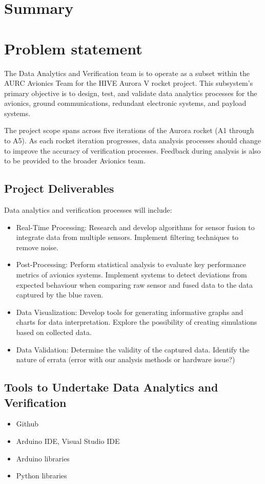 \section{Summary}
\section{Problem statement}
The Data Analytics and Verification team is to operate as a subset within the AURC Avionics Team for the HIVE Aurora V rocket project. This subsystem's primary objective is to design, test, and validate data analytics processes for the avionics, ground communications, redundant electronic systems, and payload systems.  

The project scope spans across five iterations of the Aurora rocket (A1 through to A5). As each rocket iteration progresses, data analysis processes should change to improve the accuracy of verification processes. Feedback during analysis is also to be provided to the broader Avionics team.     

\subsection{Project Deliverables}
Data analytics and verification processes will include:  
\begin{itemize}
  \item Real-Time Processing: Research and develop algorithms for sensor fusion to integrate data from multiple sensors. Implement filtering techniques to remove noise. 
  \item Post-Processing: Perform statistical analysis to evaluate key performance metrics of avionics systems. Implement systems to detect deviations from expected behaviour when comparing raw sensor and fused data to the data captured by the blue raven.     
  \item Data Visualization: Develop tools for generating informative graphs and charts for data interpretation. Explore the possibility of creating simulations based on collected data. 
  \item Data Validation: Determine the validity of the captured data. Identify the nature of errata (error with our analysis methods or hardware issue?) 
\end{itemize}


\subsection{Tools to Undertake Data Analytics and Verification}
\begin{itemize}
  \item Github  
  \item Arduino IDE, Visual Studio IDE  
  \item Arduino libraries  
  \item Python libraries  
\end{itemize}

